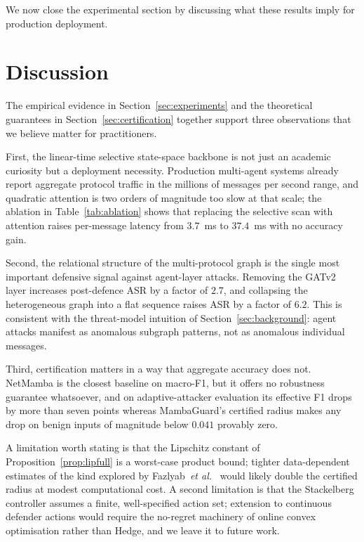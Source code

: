 \documentclass[journal,10pt,twocolumn]{IEEEtran}
\begin{document}
We now close the experimental section by discussing what these results imply for production deployment.

\section{Discussion}
\label{sec:discussion}

The empirical evidence in Section~\ref{sec:experiments} and the theoretical guarantees in Section~\ref{sec:certification} together support three observations that we believe matter for practitioners.

First, the linear-time selective state-space backbone is not just an academic curiosity but a deployment necessity. Production multi-agent systems already report aggregate protocol traffic in the millions of messages per second range, and quadratic attention is two orders of magnitude too slow at that scale; the ablation in Table~\ref{tab:ablation} shows that replacing the selective scan with attention raises per-message latency from $3.7$~ms to $37.4$~ms with no accuracy gain.

Second, the relational structure of the multi-protocol graph is the single most important defensive signal against agent-layer attacks. Removing the GATv2 layer increases post-defence ASR by a factor of $2.7$, and collapsing the heterogeneous graph into a flat sequence raises ASR by a factor of $6.2$. This is consistent with the threat-model intuition of Section~\ref{sec:background}: agent attacks manifest as anomalous subgraph patterns, not as anomalous individual messages.

Third, certification matters in a way that aggregate accuracy does not. NetMamba is the closest baseline on macro-F1, but it offers no robustness guarantee whatsoever, and on adaptive-attacker evaluation its effective F1 drops by more than seven points whereas MambaGuard's certified radius makes any drop on benign inputs of magnitude below $0.041$ provably zero.

A limitation worth stating is that the Lipschitz constant of Proposition~\ref{prop:lipfull} is a worst-case product bound; tighter data-dependent estimates of the kind explored by Fazlyab~\textit{et al.}~\cite{Fazlyab2019LipSDP} would likely double the certified radius at modest computational cost. A second limitation is that the Stackelberg controller assumes a finite, well-specified action set; extension to continuous defender actions would require the no-regret machinery of online convex optimisation rather than Hedge, and we leave it to future work.
\end{document}
